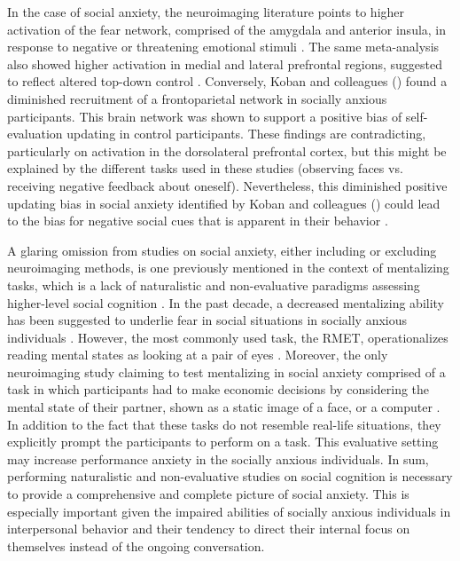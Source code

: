 In the case of social anxiety, the neuroimaging literature points to higher activation of the fear network, comprised of the amygdala and anterior insula, in response to negative or threatening emotional stimuli \citep{bruhl2014,etkin2007}. The same meta-analysis also showed higher activation in medial and lateral prefrontal regions, suggested to reflect altered top-down control \citep{bruhl2014}. Conversely, Koban and colleagues (\citeyear{koban2023}) found a diminished recruitment of a frontoparietal network in socially anxious participants. This brain network was shown to support a positive bias of self-evaluation updating in control participants. These findings are contradicting, particularly on activation in the dorsolateral prefrontal cortex, but this might be explained by the different tasks used in these studies (observing faces vs. receiving negative feedback about oneself). Nevertheless, this diminished positive updating bias in social anxiety identified by Koban and colleagues (\citeyear{koban2023}) could lead to the bias for negative social cues that is apparent in their behavior \citep{alvi2020}.

A glaring omission from studies on social anxiety, either including or excluding neuroimaging methods, is one previously mentioned in the context of mentalizing tasks, which is a lack of naturalistic and non-evaluative paradigms assessing higher-level social cognition \citep{freitas-ferrari2010}. In the past decade, a decreased mentalizing ability has been suggested to underlie fear in social situations in socially anxious individuals \citep{hezel2014}. However, the most commonly used task, the RMET, operationalizes reading mental states as looking at a pair of eyes \citep[for a review]{baez2023}. Moreover, the only neuroimaging study claiming to test mentalizing in social anxiety comprised of a task in which participants had to make economic decisions by considering the mental state of their partner, shown as a static image of a face, or a computer \citep{sripada2009}. In addition to the fact that these tasks do not resemble real-life situations, they explicitly prompt the participants to perform on a task. This evaluative setting may increase performance anxiety in the socially anxious individuals. In sum, performing naturalistic and non-evaluative studies on social cognition is necessary to provide a comprehensive and complete picture of social anxiety. This is especially important given the impaired abilities of socially anxious individuals in interpersonal behavior and their tendency to direct their internal focus on themselves instead of the ongoing conversation.


